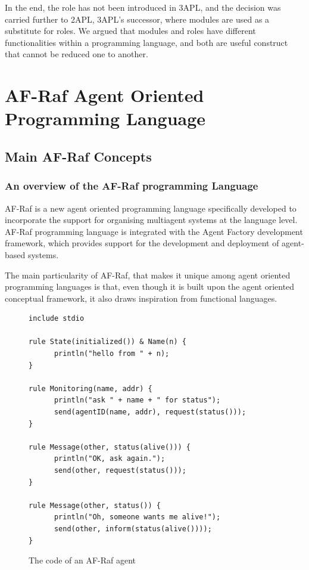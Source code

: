 \documentclass[a4paper,12pt,oneside,fleqn]{book} %
\newcommand{\todo}[1]{[\textcolor{red}{TODO}: #1]}
\begin{document}
In the end, the role has not been introduced in 3APL, and the decision was
carried further to 2APL\cite{DBLP:journals/aamas/Dastani08}, 3APL's
successor, where modules are used as a substitute for roles. We argued that
modules and roles have different functionalities within a programming
language, and both are useful construct that cannot be reduced one to
another.


\part{AF-Raf Agent Oriented Programming Language}\label{part:AF-Raf} %
\chapter{Main AF-Raf Concepts}\label{ch:concepts} %


\section{An overview of the AF-Raf programming Language} %

AF-Raf is a new agent oriented programming language specifically developed
to incorporate the support for organising multiagent systems at the
language level. AF-Raf programming language is integrated with the
Agent Factory development framework, which provides support for the
development and deployment of agent-based systems.

The main particularity of AF-Raf, that makes it unique among agent oriented
programming languages is that, even though it is built upon the agent
oriented conceptual framework, it also draws inspiration from functional
languages.

\begin{figure}\footnotesize %
\begin{verbatim}
include stdio

rule State(initialized()) & Name(n) {
      println("hello from " + n);
}

rule Monitoring(name, addr) {
      println("ask " + name + " for status");
      send(agentID(name, addr), request(status()));
}

rule Message(other, status(alive())) {
      println("OK, ask again.");
      send(other, request(status()));
}

rule Message(other, status()) {
      println("Oh, someone wants me alive!");
      send(other, inform(status(alive())));
}
\end{verbatim}
\caption{The code of an AF-Raf agent}
\label{fig:AF-Raf}
\end{figure} %
\end{document}
